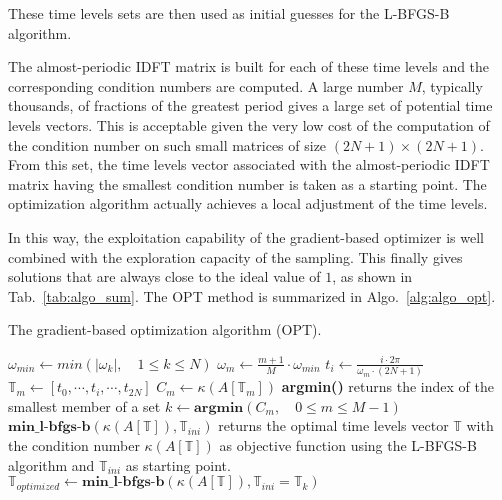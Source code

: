 These time levels sets are then used as initial guesses for the
L-BFGS-B algorithm.

The almost-periodic IDFT matrix is built for
each of these time levels and the corresponding condition numbers are
computed.  A large number $M$, typically thousands, of fractions of the
greatest period gives a large set of potential time levels vectors.
This is acceptable given the very low cost of the computation of the
condition number on such small matrices of size $(2N + 1) \times
(2N+1)$.  From this set, the time levels vector associated with the
almost-periodic IDFT matrix having the smallest condition number is
taken as a starting point.  The optimization algorithm actually achieves
a local adjustment of the time levels.

In this way, the exploitation capability of the gradient-based
optimizer is well combined with the exploration capacity of the
sampling.  This finally gives solutions that are always close to the
ideal value of $1$, as shown in Tab.~\ref{tab:algo_sum}.  The OPT
method is summarized in Algo.~\ref{alg:algo_opt}.
\begin{algorithm}
\caption{The gradient-based optimization algorithm (OPT).}
\label{alg:algo_opt}
\begin{algorithmic}
\STATE $\omega_{min} \leftarrow min \left( |\omega_k |,\quad 1 \leqslant k \leqslant N \right)$
    \STATE $\omega_m \leftarrow \frac{m + 1}{M} \cdot \omega_{min}$
        \STATE $t_i \leftarrow \displaystyle\frac{i \cdot 2 \pi}{\omega_m \cdot (2N + 1)}$
    \ENDFOR
    \STATE $\mathbb{T}_m \leftarrow [t_0, \cdots, t_i, \cdots, t_{2N}]$
    \STATE $C_m \leftarrow \kappa \left(A \left[\mathbb{T}_m \right] \right)$
\ENDFOR
\STATE \textbf{argmin()} returns the index of the smallest member of a set
\STATE $k \leftarrow \textbf{argmin}\left(C_m,\quad 0\leqslant m \leqslant M-1\right)$
\STATE $\textbf{min\_l-bfgs-b}\left(\kappa \left(A\left[\mathbb{T}\right]\right), \mathbb{T}_{ini}\right)$ returns the optimal 
time levels vector $\mathbb{T}$ with the condition number $\kappa\left(A\left[\mathbb{T}\right]\right)$ as objective function 
using the L-BFGS-B algorithm and  $\mathbb{T}_{ini}$ as starting point.
\STATE $\mathbb{T}_{optimized} \leftarrow 
  \textbf{min\_l-bfgs-b}\left(\kappa\left(A\left[\mathbb{T}\right]\right), \mathbb{T}_{ini}=\mathbb{T}_k\right)$
\end{algorithmic}
\end{algorithm}


